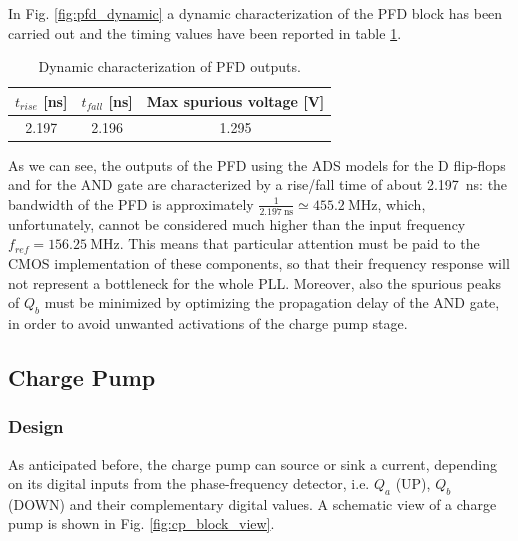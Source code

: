 \documentclass[lettersize,journal]{IEEEtran}
\begin{document}
In Fig. \ref{fig:pfd_dynamic} a dynamic characterization of the PFD block has been carried out and the timing values have been reported in table \ref{tab:pfd_dynamic_values}.

\begin{table}[]
    \renewcommand{\arraystretch}{1.5}
    \centering
    \caption{Dynamic characterization of PFD outputs.}
    \label{tab:pfd_dynamic_values}
    \begin{tabular}{|c|c|c|}
    \hline
    $t_{rise}$ [\unit{\nano\second}] & $t_{fall}$ [\unit{\nano\second}] & Max spurious voltage [\unit{\volt}] \\ \hline
    2.197                   & 2.196                     & 1.295              \\ \hline
    \end{tabular}
\end{table}

As we can see, the outputs of the PFD using the ADS models for the D flip-flops and for the AND gate are characterized by a rise/fall time of about \SI{2.197}{\nano\second}: the bandwidth of the PFD is approximately $\frac{1}{\SI{2.197}{\nano\second}}\simeq\SI{455.2}{\mega\hertz}$, which, unfortunately, cannot be considered much higher than the input frequency $f_{ref}=\SI{156.25}{\mega\hertz}$. This means that particular attention must be paid to the CMOS implementation of these components, so that their frequency response will not represent a bottleneck for the whole PLL. Moreover, also the spurious peaks of $Q_b$ must be minimized by optimizing the propagation delay of the AND gate, in order to avoid unwanted activations of the charge pump stage.


\subsection{Charge Pump}
\label{sec:charge_pump}

\subsubsection{Design}
As anticipated before, the charge pump can source or sink a current, depending on its digital inputs from the phase-frequency detector, i.e. $Q_a$ (UP), $Q_b$ (DOWN) and their complementary digital values. A schematic view of a charge pump is shown in Fig. \ref{fig:cp_block_view}.
\end{document}
